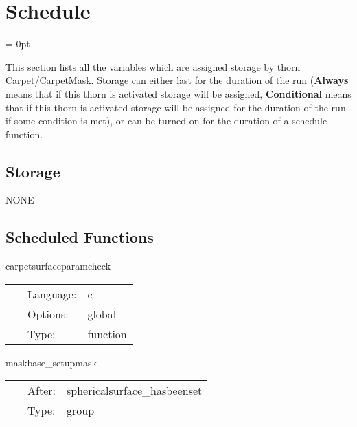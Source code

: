 
\section{Schedule} 


\parskip = 0pt


\noindent This section lists all the variables which are assigned storage by thorn Carpet/CarpetMask.  Storage can either last for the duration of the run ({\bf Always} means that if this thorn is activated storage will be assigned, {\bf Conditional} means that if this thorn is activated storage will be assigned for the duration of the run if some condition is met), or can be turned on for the duration of a schedule function.


\subsection*{Storage}NONE
\subsection*{Scheduled Functions}
\vspace{5mm}


\hspace{5mm} carpetsurfaceparamcheck 

\hspace{5mm}{\it check parameters } 


\hspace{5mm}

 \begin{tabular*}{160mm}{cll} 
~ & Language:  & c \\ 
~ & Options:  & global \\ 
~ & Type:  & function \\ 
\end{tabular*} 


\vspace{5mm}


\hspace{5mm} maskbase\_setupmask 

\hspace{5mm}{\it set up the weight function } 


\hspace{5mm}

 \begin{tabular*}{160mm}{cll} 
~ & After:  & sphericalsurface\_hasbeenset \\ 
~ & Type:  & group \\ 
\end{tabular*} 


